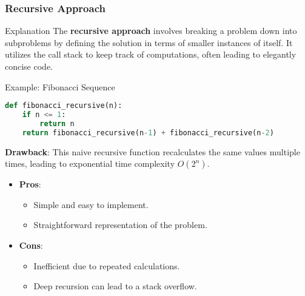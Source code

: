 \documentclass[aspectratio=169]{beamer}
\begin{document}
\begin{frame}[fragile]
  \frametitle{Recursive Approach}
  \begin{block}{Explanation}
    The \textbf{recursive approach} involves breaking a problem down into subproblems by defining the solution in terms of smaller instances of itself. It utilizes the call stack to keep track of computations, often leading to elegantly concise code.
  \end{block}
    
  \begin{block}{Example: Fibonacci Sequence}
    \begin{lstlisting}[language=Python]
def fibonacci_recursive(n):
    if n <= 1:
        return n
    return fibonacci_recursive(n-1) + fibonacci_recursive(n-2)
    \end{lstlisting}
    \textbf{Drawback}: This naive recursive function recalculates the same values multiple times, leading to exponential time complexity \( O(2^n) \).
  \end{block}

  \begin{itemize}
    \item \textbf{Pros}:
      \begin{itemize}
        \item Simple and easy to implement.
        \item Straightforward representation of the problem.
      \end{itemize}
    \item \textbf{Cons}:
      \begin{itemize}
        \item Inefficient due to repeated calculations.
        \item Deep recursion can lead to a stack overflow.
      \end{itemize}
  \end{itemize}
\end{frame}
\end{document}
